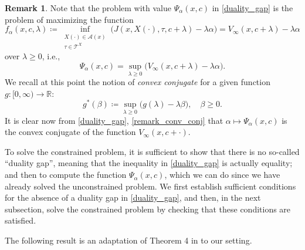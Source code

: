 \documentclass[11pt,tbtags,reqno]{article}
\theoremstyle{definition}
\newtheorem{remark}[Th]{Remark}
\numberwithin{equation}{section}
\theoremstyle{definition}
\begin{document}
\begin{remark}
    Note that the problem with value $\Psi_\alpha(x, c)$ in \eqref{duality_gap} is the problem of maximizing the function
    \begin{equation}
        f_\alpha(x, c, \lambda) 
        \coloneqq 
        \inf\limits_{\substack{X(\cdot) \in \mathcal{A}(x) \\ \tau \in \mathcal{T}^X}} 
        \Big(
            J(x, X(\cdot), \tau, c + \lambda) - \lambda \alpha 
        \Big)
        =
        V_\infty(x, c + \lambda) - \lambda \alpha
    \end{equation}
    over $\lambda \ge 0$, i.e., 
    \begin{equation}\label{remark_conv_conj}
        \Psi_\alpha(x, c) = \sup_{\lambda \ge 0} \Big(V_\infty(x, c + \lambda) - \lambda \alpha \Big).
    \end{equation}
    We recall at this point the notion of \textit{convex conjugate} for a given function $g: [0, \infty) \to \mathbb{R}$:
    \begin{equation}
        g^*(\beta) \coloneqq \sup_{\lambda \ge 0} \Big(g(\lambda) - \lambda \beta\Big), \quad \beta \ge 0.
    \end{equation}
    It is clear now from \eqref{duality_gap}, \eqref{remark_conv_conj} that $\alpha \mapsto \Psi_\alpha(x, c)$ is the convex conjugate of the function $V_\infty(x, c + \cdot)$.
\end{remark}

To solve the constrained problem, it is sufficient to show that there is no so-called ``duality gap'', meaning that the inequality in \eqref{duality_gap} is actually equality; and then to compute the function $\Psi_\alpha(x, c)$, which we can do since we have 
already solved the unconstrained problem. We first establish sufficient conditions for the absence of a duality gap in \eqref{duality_gap}, and then, in the next subsection, solve the constrained problem by checking that these conditions are satisfied.

The following result is an adaptation of Theorem 4 in \cite{Kennedy82} to our setting.
\end{document}
